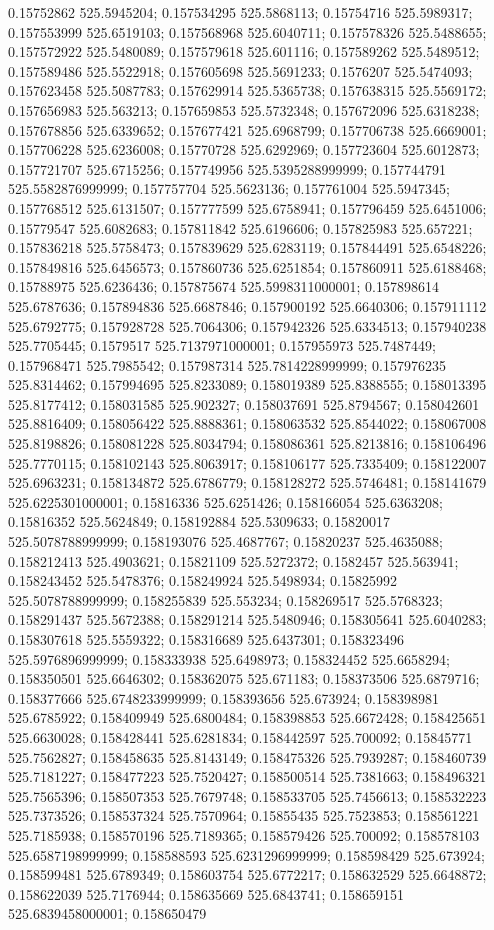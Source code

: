 0.15752862 525.5945204; 0.157534295 525.5868113; 0.15754716 525.5989317; 0.157553999 525.6519103; 0.157568968 525.6040711; 0.157578326 525.5488655; 0.157572922 525.5480089; 0.157579618 525.601116; 0.157589262 525.5489512; 0.157589486 525.5522918; 0.157605698 525.5691233; 0.1576207 525.5474093; 0.157623458 525.5087783; 0.157629914 525.5365738; 0.157638315 525.5569172; 0.157656983 525.563213; 0.157659853 525.5732348; 0.157672096 525.6318238; 0.157678856 525.6339652; 0.157677421 525.6968799; 0.157706738 525.6669001; 0.157706228 525.6236008; 0.15770728 525.6292969; 0.157723604 525.6012873; 0.157721707 525.6715256; 0.157749956 525.5395288999999; 0.157744791 525.5582876999999; 0.157757704 525.5623136; 0.157761004 525.5947345; 0.157768512 525.6131507; 0.157777599 525.6758941; 0.157796459 525.6451006; 0.15779547 525.6082683; 0.157811842 525.6196606; 0.157825983 525.657221; 0.157836218 525.5758473; 0.157839629 525.6283119; 0.157844491 525.6548226; 0.157849816 525.6456573; 0.157860736 525.6251854; 0.157860911 525.6188468; 0.15788975 525.6236436; 0.157875674 525.5998311000001; 0.157898614 525.6787636; 0.157894836 525.6687846; 0.157900192 525.6640306; 0.157911112 525.6792775; 0.157928728 525.7064306; 0.157942326 525.6334513; 0.157940238 525.7705445; 0.1579517 525.7137971000001; 0.157955973 525.7487449; 0.157968471 525.7985542; 0.157987314 525.7814228999999; 0.157976235 525.8314462; 0.157994695 525.8233089; 0.158019389 525.8388555; 0.158013395 525.8177412; 0.158031585 525.902327; 0.158037691 525.8794567; 0.158042601 525.8816409; 0.158056422 525.8888361; 0.158063532 525.8544022; 0.158067008 525.8198826; 0.158081228 525.8034794; 0.158086361 525.8213816; 0.158106496 525.7770115; 0.158102143 525.8063917; 0.158106177 525.7335409; 0.158122007 525.6963231; 0.158134872 525.6786779; 0.158128272 525.5746481; 0.158141679 525.6225301000001; 0.15816336 525.6251426; 0.158166054 525.6363208; 0.15816352 525.5624849; 0.158192884 525.5309633; 0.15820017 525.5078788999999; 0.158193076 525.4687767; 0.15820237 525.4635088; 0.158212413 525.4903621; 0.15821109 525.5272372; 0.1582457 525.563941; 0.158243452 525.5478376; 0.158249924 525.5498934; 0.15825992 525.5078788999999; 0.158255839 525.553234; 0.158269517 525.5768323; 0.158291437 525.5672388; 0.158291214 525.5480946; 0.158305641 525.6040283; 0.158307618 525.5559322; 0.158316689 525.6437301; 0.158323496 525.5976896999999; 0.158333938 525.6498973; 0.158324452 525.6658294; 0.158350501 525.6646302; 0.158362075 525.671183; 0.158373506 525.6879716; 0.158377666 525.6748233999999; 0.158393656 525.673924; 0.158398981 525.6785922; 0.158409949 525.6800484; 0.158398853 525.6672428; 0.158425651 525.6630028; 0.158428441 525.6281834; 0.158442597 525.700092; 0.15845771 525.7562827; 0.158458635 525.8143149; 0.158475326 525.7939287; 0.158460739 525.7181227; 0.158477223 525.7520427; 0.158500514 525.7381663; 0.158496321 525.7565396; 0.158507353 525.7679748; 0.158533705 525.7456613; 0.158532223 525.7373526; 0.158537324 525.7570964; 0.15855435 525.7523853; 0.158561221 525.7185938; 0.158570196 525.7189365; 0.158579426 525.700092; 0.158578103 525.6587198999999; 0.158588593 525.6231296999999; 0.158598429 525.673924; 0.158599481 525.6789349; 0.158603754 525.6772217; 0.158632529 525.6648872; 0.158622039 525.7176944; 0.158635669 525.6843741; 0.158659151 525.6839458000001; 0.158650479 